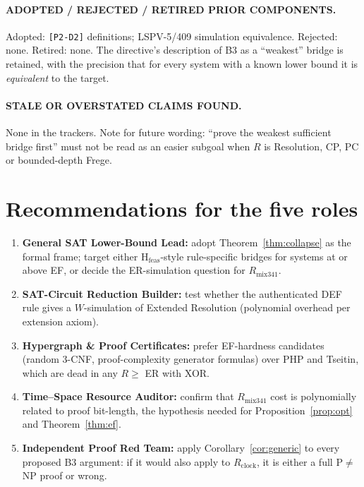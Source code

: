 \documentclass[11pt]{article}
\theoremstyle{definition}
\theoremstyle{remark}
\begin{document}
\paragraph{ADOPTED / REJECTED / RETIRED PRIOR COMPONENTS.}
Adopted: \texttt{[P2-D2]} definitions; LSPV-5/409 simulation equivalence.
Rejected: none. Retired: none. The directive's description of B3 as a
``weakest'' bridge is retained, with the precision that for every system with a
known lower bound it is \emph{equivalent} to the target.

\paragraph{STALE OR OVERSTATED CLAIMS FOUND.} None in the trackers. Note for
future wording: ``prove the weakest sufficient bridge first'' must not be read
as an easier subgoal when $R$ is Resolution, CP, PC or bounded-depth Frege.

\section{Recommendations for the five roles}

\begin{enumerate}
\item \textbf{General SAT Lower-Bound Lead:} adopt Theorem~\ref{thm:collapse} as
the formal frame; target either $\mathrm{H}_{\mathrm{feas}}$-style rule-specific
bridges for systems at or above EF, or decide the ER-simulation question for
$R_{\mathrm{mix341}}$.
\item \textbf{SAT-Circuit Reduction Builder:} test whether the authenticated DEF
rule gives a $W$-simulation of Extended Resolution (polynomial overhead per
extension axiom).
\item \textbf{Hypergraph \& Proof Certificates:} prefer EF-hardness candidates
(random 3-CNF, proof-complexity generator formulas) over PHP and Tseitin, which
are dead in any $R\ge$ ER with XOR.
\item \textbf{Time--Space Resource Auditor:} confirm that $R_{\mathrm{mix341}}$ cost
is polynomially related to proof bit-length, the hypothesis needed for
Proposition~\ref{prop:opt} and Theorem~\ref{thm:ef}.
\item \textbf{Independent Proof Red Team:} apply Corollary~\ref{cor:generic}
to every proposed B3 argument: if it would also apply to
$R_{\mathrm{clock}}$, it is either a full P$\ne$NP proof or wrong.
\end{enumerate}
\end{document}
